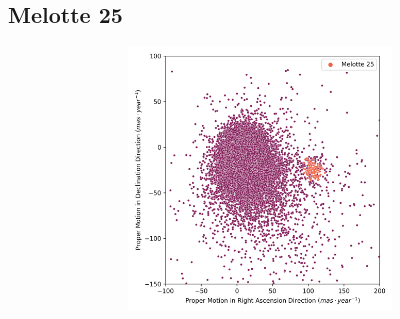 \documentclass[11pt, a4paper, english]{book}
\begin{document}
\vfill

\newpage

\subsection{Melotte 25}

\begin{figure}[H]
  \vfil
  \centering
  \begin{subfigure}{0.9\textwidth}
    \centering
    \begin{subfigure}[t]{0.30\textwidth}
      \centering
      \includegraphics[width=\textwidth]{../figures/melotte_25/pm_melotte_25.png}
    \end{subfigure}
    \hfill
    \begin{subfigure}[t]{0.30\textwidth}
      \centering

\end{subfigure}
\end{subfigure}
\end{figure}
\end{document}
